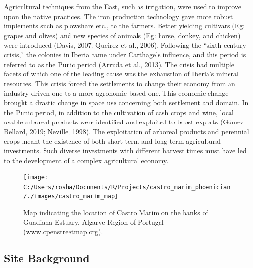 \documentclass[5p]{elsarticle} %
\begin{document}
Agricultural techniques from the East, such as irrigation, were used to improve upon the native practices. The iron production technology gave more robust implements such as plowshare etc., to the farmers. Better yielding cultivars (Eg: grapes and olives) and new species of animals (Eg: horse, donkey, and chicken) were introduced (Davis, 2007; Queiroz et al., 2006). Following the ``sixth century crisis,'' the colonies in Iberia came under Carthage's influence, and this period is referred to as the Punic period (Arruda et al., 2013). The crisis had multiple facets of which one of the leading cause was the exhaustion of Iberia's mineral resources. This crisis forced the settlements to change their economy from an industry-driven one to a more agronomic-based one. This economic change brought a drastic change in space use concerning both settlement and domain. In the Punic period, in addition to the cultivation of cash crops and wine, local usable arboreal products were identified and exploited to boost exports (Gómez Bellard, 2019; Neville, 1998). The exploitation of arboreal products and perennial crops meant the existence of both short-term and long-term agricultural investments. Such diverse investments with different harvest times must have led to the development of a complex agricultural economy.

\begin{figure}
\texttt{[image: C:/Users/rosha/Documents/R/Projects/castro\_marim\_phoenician/./images/castro\_marim\_map]} \caption{Map indicating the location of Castro Marim on the banks of Guadiana Estuary, Algarve Region of Portugal (www.openstreetmap.org).}\label{fig:castro-marim-loc}
\end{figure}

\hypertarget{site-background}{%
\subsection{Site Background}\label{site-background}}
\end{document}
